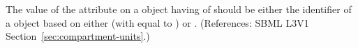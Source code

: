 The value of the attribute  on a \Compartment object having
 of  should be either
 the identifier of a \UnitDefinition
object based on either  (with  equal to
) or .  (References: SBML L3V1
Section~\ref{sec:compartment-units}.)
